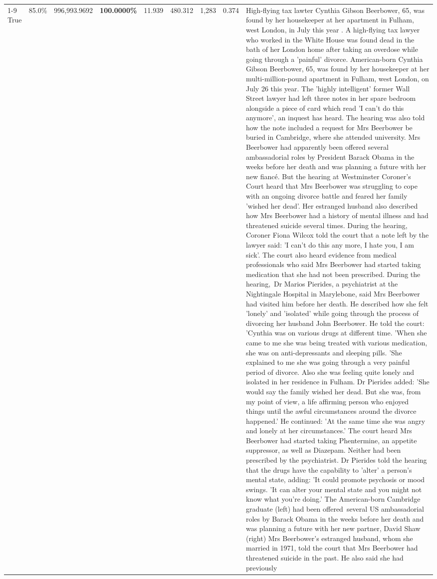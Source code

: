 \begin{table}[H]
\begin{tabular}{lllrlllll}
\cline{1-9}
True & 85.0\% & 996,993.9692 & \bfseries \color{red} 100.0000\% & 11.939 & 480.312 & 1,283 & 0.374 & High-flying tax lawter Cynthia Gibson Beerbower, 65, was found by her housekeeper at her apartment in Fulham, west London, in July this year . A high-flying tax lawyer who worked in the White House was found dead in the bath of her London home after taking an overdose while going through a 'painful' divorce. American-born Cynthia Gibson Beerbower, 65, was found by her housekeeper at her multi-million-pound apartment in Fulham, west London, on July 26 this year. The 'highly intelligent' former Wall Street lawyer had left three notes in her spare bedroom alongside a piece of card which read 'I can't do this anymore', an inquest has heard. The hearing was also told how the note included a request for Mrs Beerbower be buried in Cambridge, where she attended university. Mrs Beerbower had apparently been offered several ambassadorial roles by President Barack Obama in the weeks before her death and was planning a future with her new fiancé. But the hearing at Westminster Coroner's Court heard that Mrs Beerbower was struggling to cope with an ongoing divorce battle and feared her family 'wished her dead'. Her estranged husband also described how Mrs Beerbower had a history of mental illness and had threatened suicide several times. During the hearing, Coroner Fiona Wilcox told the court that a note left by the lawyer said: 'I can't do this any more, I hate you, I am sick'. The court also heard evidence from medical professionals who said Mrs Beerbower had started taking medication that she had not been prescribed. During the hearing, Dr Marios Pierides, a psychiatrist at the Nightingale Hospital in Marylebone, said Mrs Beerbower had visited him before her death. He described how she felt 'lonely' and 'isolated' while going through the process of divorcing her husband John Beerbower. He told the court: 'Cynthia was on various drugs at different time. 'When she came to me she was being treated with various medication, she was on anti-depressants and sleeping pills. 'She explained to me she was going through a very painful period of divorce. Also she was feeling quite lonely and isolated in her residence in Fulham. Dr Pierides added: 'She would say the family wished her dead. But she was, from my point of view, a life affirming person who enjoyed things until the awful circumstances around the divorce happened.' He continued: 'At the same time she was angry and lonely at her circumstances.' The court heard Mrs Beerbower had started taking Phentermine, an appetite suppressor, as well as Diazepam. Neither had been prescribed by the psychiatrist. Dr Pierides told the hearing that the drugs have the capability to 'alter' a person's mental state, adding: 'It could promote psychosis or mood swings. 'It can alter your mental state and you might not know what you're doing.' The American-born Cambridge graduate (left) had been offered several US ambassadorial roles by Barack Obama in the weeks before her death and was planning a future with her new partner, David Shaw (right) Mrs Beerbower's estranged husband, whom she married in 1971, told the court that Mrs Beerbower had threatened suicide in the past. He also said she had previously 
\end{tabular}
\end{table}

